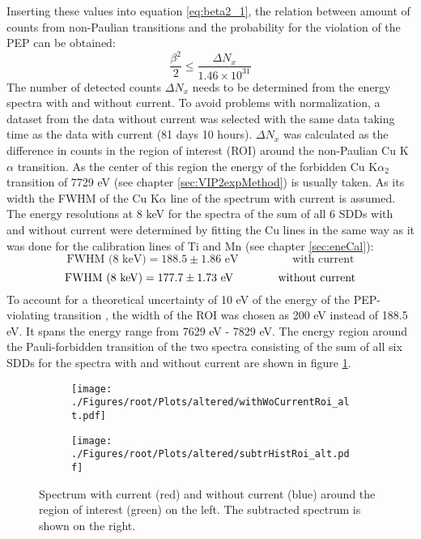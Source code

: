 Inserting these values into equation \ref{eq:beta2_1}, the relation between amount of counts from non-Paulian transitions and the probability for the violation of the PEP can be obtained:
\begin{equation}
  \frac{\beta^{2}}{2} \leq \frac{\Delta N_{x}}{1.46 \times 10^{31}}
  \label{eq:beta2calc}
\end{equation} 
The number of detected counts $\Delta N_{x}$ needs to be determined from the energy spectra with and without current. To avoid problems with normalization, a dataset from the data without current was selected with the same data taking time as the data with current (81 days 10 hours). $\Delta N_{x}$ was calculated as the difference in counts in the region of interest (ROI) around the non-Paulian Cu K$\alpha$ transition. As the center of this region the energy of the forbidden Cu K$\alpha_{2}$ transition of 7729 eV (see chapter \ref{sec:VIP2expMethod}) is usually taken. As its width the FWHM of the Cu K$\alpha$ line of the spectrum with current is assumed. The energy resolutions at 8 keV for the spectra of the sum of all 6 SDDs with and without current were determined by fitting the Cu lines in the same way as it was done for the calibration lines of Ti and Mn (see chapter \ref{sec:eneCal}):
\begin{equation}
 \textrm{FWHM (8 keV)} = 188.5 \pm 1.86 \textrm{ eV} \hspace{2cm} \textrm{with current}
\end{equation} 
\begin{equation}
 \textrm{FWHM (8 keV)} = 177.7 \pm 1.73 \textrm{ eV} \hspace{1.4cm} \textrm{without current}
\end{equation} 
To account for a theoretical uncertainty of 10 eV of the energy of the PEP-violating transition \cite{Bartalucci2006}, the width of the ROI was chosen as 200 eV instead of 188.5 eV. It spans the energy range from 7629 eV - 7829 eV. The energy region around the Pauli-forbidden transition of the two spectra consisting of the sum of all six SDDs for the spectra with and without current are shown in figure \ref{fig:withWithoutRoi}.
\begin{figure}[h]
 \centering
 \begin{subfigure}{.49\textwidth}
 \centering
 \texttt{[image: ./Figures/root/Plots/altered/withWoCurrentRoi\_alt.pdf]}
 \end{subfigure}
 \hfill
 \begin{subfigure}{.49\textwidth}
 \centering
 \texttt{[image: ./Figures/root/Plots/altered/subtrHistRoi\_alt.pdf]}
 \end{subfigure}
 \caption{Spectrum with current (red) and without current (blue) around the region of interest (green) on the left. The subtracted spectrum is shown on the right.}
 \label{fig:withWithoutRoi}
\end{figure}
